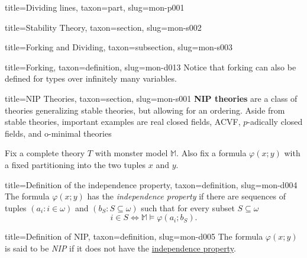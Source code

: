 \documentclass[a4paper]{article}
\begin{document}
\begin{tree}{title={Dividing lines}, taxon={part}, slug={mon-p001}}
\begin{tree}{title={Stability Theory}, taxon={section}, slug={mon-s002}}
\begin{tree}{title={Forking and Dividing}, taxon={subsection}, slug={mon-s003}}
\begin{tree}{title={Forking}, taxon={definition}, slug={mon-d013}}
Notice that forking can also be defined for types over infinitely many variables.

\end{tree}

\end{tree}

\end{tree}


    
    
\begin{tree}{title={NIP Theories}, taxon={section}, slug={mon-s001}}
\textbf{NIP theories} are a class of theories generalizing stable
theories, but allowing for an ordering. Aside from stable theories,
important examples are real closed fields, ACVF, \(p\)-adically closed
fields, and o-minimal theories\par{Fix a complete theory \(T\) with monster model \(\mathbb {M}\).
Also fix a formula \(\varphi (x;y)\) with a fixed partitioning into
the two tuples \(x\) and \(y\).}
\begin{tree}{title={Definition of the independence property}, taxon={definition}, slug={mon-d004}}
The formula \(\varphi (x;y)\) has the \emph{independence property} if there
are sequences of tuples \((a_i : i  \in   \omega )\) and
\((b_S : S  \subseteq   \omega )\) such that for every subset \(S  \subseteq   \omega\)
\[i  \in  S  \Longleftrightarrow   \mathbb {M}  \models   \varphi (a_i; b_S).\]
\end{tree}

\begin{tree}{title={Definition of NIP}, taxon={definition}, slug={mon-d005}}
The formula \(\varphi (x;y)\) is said to be \emph{NIP} if it does not have
the \href{mon-0004}{independence property}.
\end{tree}


\end{tree}
\end{tree}
\end{document}
